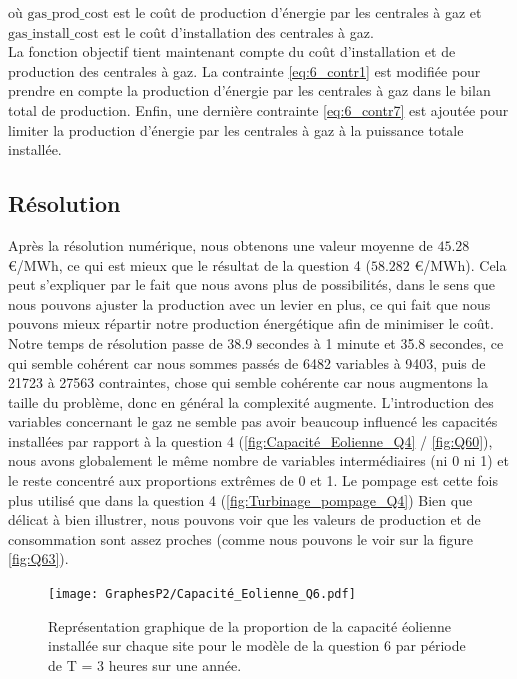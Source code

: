 \documentclass{article}
\begin{document}
\noindent où $\mathrm{gas\_prod\_cost}$ est le coût de production d'énergie par les centrales à gaz et $\mathrm{gas\_install\_cost}$ est le coût d'installation des centrales à gaz.\\
La fonction objectif tient maintenant compte du coût d'installation et de production des centrales à gaz. La contrainte \eqref{eq:6_contr1} est modifiée pour prendre en compte la production d'énergie par les centrales à gaz dans le bilan total de production. 
Enfin, une dernière contrainte \eqref{eq:6_contr7} est ajoutée pour limiter la production d'énergie par les centrales à gaz à la puissance totale installée.

\pagebreak

\subsection*{Résolution}
Après la résolution numérique, nous obtenons une valeur moyenne de $\mathbf{45.28}$ \euro/MWh, ce qui est mieux que 
le résultat de la question 4 ($\mathbf{58.282}$ \euro/MWh). Cela peut s'expliquer par le fait que nous
avons plus de possibilités, dans le sens que nous pouvons ajuster la production avec un levier en plus,
ce qui fait que nous pouvons mieux répartir notre production énergétique afin de minimiser le coût. \\
Notre temps de résolution passe de 38.9 secondes à 1 minute et 35.8 secondes, ce qui semble cohérent car nous sommes passés
de 6482 variables à 9403, puis de 21723 à 27563 contraintes, chose qui semble cohérente car nous augmentons la taille du problème, donc
en général la complexité augmente. 
L'introduction des variables concernant le gaz ne semble pas avoir beaucoup influencé les capacités installées par rapport à la question 4 (\autoref{fig:Capacité_Eolienne_Q4} / \autoref{fig:Q60}), nous avons
globalement le même nombre de variables intermédiaires (ni 0 ni 1) et le reste concentré aux proportions extrêmes de 0 et 1. 
Le pompage est cette fois plus utilisé que dans la question 4 (\autoref{fig:Turbinage_pompage_Q4})
Bien que délicat à bien illustrer, nous pouvons voir que les valeurs de production et de consommation sont 
assez proches (comme nous pouvons le voir sur la figure \ref{fig:Q63}).

\begin{figure}[h!]
    \centering
    \texttt{[image: GraphesP2/Capacité\_Eolienne\_Q6.pdf]}
    \caption{Représentation graphique de la proportion de la capacité éolienne installée sur chaque site pour le modèle de la question 6 par période
    de T = 3 heures sur une année.}
    \label{fig:Q60}
\end{figure}
\end{document}
